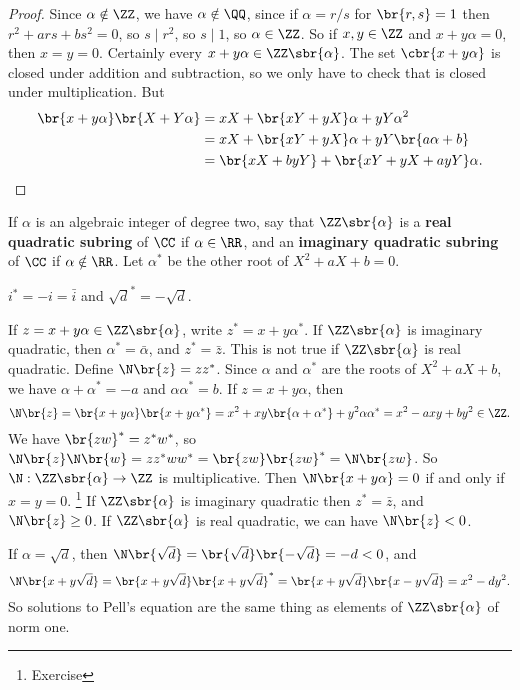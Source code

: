 \begin{proof}
Since $ \alpha \notin \ZZ $, we have $ \alpha \notin \QQ $, since if $ \alpha = r / s $ for $ \br{r, s} = 1 $ then $ r^2 + ars + bs^2 = 0 $,
so $ s \mid r^2 $, so $ s \mid 1 $, so $ \alpha \in \ZZ $. So if $ x, y \in \ZZ $ and $ x + y\alpha = 0 $, then $ x = y = 0 $. Certainly every $ x + y\alpha \in \ZZ\sbr{\alpha} $. The set $ \cbr{x + y\alpha} $ is closed under addition and subtraction, so we only have to check that is closed under multiplication. But
\begin{align*}
\br{x + y\alpha}\br{X + Y\alpha}
& = xX + \br{xY + yX}\alpha + yY\alpha^2 \\
& = xX + \br{xY + yX}\alpha + yY\br{a\alpha + b} \\
& = \br{xX + byY} + \br{xY + yX + ayY}\alpha.
\end{align*}
\end{proof}

\pagebreak

If $ \alpha $ is an algebraic integer of degree two, say that $ \ZZ\sbr{\alpha} $ is a \textbf{real quadratic subring} of $ \CC $ if $ \alpha \in \RR $, and an \textbf{imaginary quadratic subring} of $ \CC $ if $ \alpha \notin \RR $. Let $ \alpha^* $ be the other root of $ X^2 + aX + b = 0 $.

\begin{example*}
$ i^* = -i = \bar{i} $ and $ \sqrt{d}^* = -\sqrt{d} $.
\end{example*}

If $ z = x + y\alpha \in \ZZ\sbr{\alpha} $, write $ z^* = x + y\alpha^* $. If $ \ZZ\sbr{\alpha} $ is imaginary quadratic, then $ \alpha^* = \bar{\alpha} $, and $ z^* = \bar{z} $. This is not true if $ \ZZ\sbr{\alpha} $ is real quadratic. Define $ \N\br{z} = zz^* $. Since $ \alpha $ and $ \alpha^* $ are the roots of $ X^2 + aX + b $, we have $ \alpha + \alpha^* = -a $ and $ \alpha\alpha^* = b $. If $ z = x + y\alpha $, then
$$ \N\br{z} = \br{x + y\alpha}\br{x + y\alpha^*} = x^2 + xy\br{\alpha + \alpha^*} + y^2\alpha\alpha^* = x^2 - axy + by^2 \in \ZZ. $$
We have $ \br{zw}^* = z^*w^* $, so $ \N\br{z}\N\br{w} = zz^*ww^* = \br{zw}\br{zw}^* = \N\br{zw} $. So $ \N : \ZZ\sbr{\alpha} \to \ZZ $ is multiplicative. Then $ \N\br{x + y\alpha} = 0 $ if and only if $ x = y = 0 $. \footnote{Exercise} If $ \ZZ\sbr{\alpha} $ is imaginary quadratic then $ z^* = \bar{z} $, and $ \N\br{z} \ge 0 $. If $ \ZZ\sbr{\alpha} $ is real quadratic, we can have $ \N\br{z} < 0 $.

\begin{example*}
If $ \alpha = \sqrt{d} $, then $ \N\br{\sqrt{d}} = \br{\sqrt{d}}\br{-\sqrt{d}} = -d < 0 $, and
$$ \N\br{x + y\sqrt{d}} = \br{x + y\sqrt{d}}\br{x + y\sqrt{d}}^* = \br{x + y\sqrt{d}}\br{x - y\sqrt{d}} = x^2 - dy^2. $$
So solutions to Pell's equation are the same thing as elements of $ \ZZ\sbr{\alpha} $ of norm one.
\end{example*}

